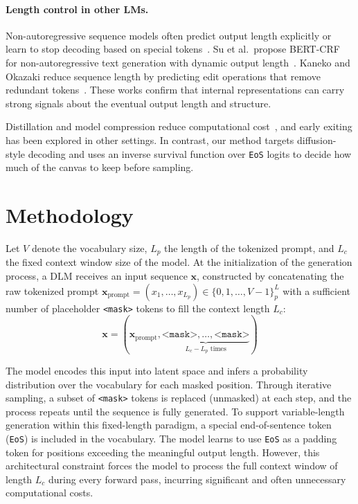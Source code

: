 \documentclass{article}
\theoremstyle{plain}
\theoremstyle{definition}
\theoremstyle{remark}
\begin{document}
\paragraph{Length control in other LMs.} Non-autoregressive sequence models often predict output length explicitly or learn to stop decoding based on special tokens~\citep{DBLP:journals/corr/abs-2004-10454}.
Su et al.\ propose BERT-CRF for non-autoregressive text generation with dynamic output length~\citep{Gu2021BERTCRF}.
Kaneko and Okazaki reduce sequence length by predicting edit operations that remove redundant tokens~\citep{kaneko2023reducingsequencelengthpredicting}.
These works confirm that internal representations can carry strong signals about the eventual output length and structure.

Distillation and model compression reduce computational cost~\citep{Sanh2019DistilBERT}, and early exiting has been explored in other settings.
In contrast, our method targets diffusion-style decoding and uses an inverse survival function over \texttt{EoS} logits to decide how much of the canvas to keep before sampling.

\section{Methodology}
\label{sec:methodology}

Let $V$ denote the vocabulary size, $L_p$ the length of the tokenized prompt, and $L_c$ the fixed context window size of the model. At the initialization of the generation process, a DLM receives an input sequence $\mathbf{x}$, constructed by concatenating the raw tokenized prompt $\mathbf{x}_{\text{prompt}}=(x_1, \dots,x_{L_p})\in\{0,1, \dots, V-1\}^L_p$ with a sufficient number of placeholder \texttt{<mask>} tokens to fill the context length $L_c$:
\begin{equation}
\mathbf{x}=(\mathbf{x}_{\text{prompt}}, \underbrace{\texttt{<mask>}, \dots, \texttt{<mask>}}_{L_c-L_p\text{ times}})
\end{equation}

The model encodes this input into latent space and infers a probability distribution over the vocabulary for each masked position. Through iterative sampling, a subset of \texttt{<mask>} tokens is replaced (unmasked) at each step, and the process repeats until the sequence is fully generated. To support variable-length generation within this fixed-length paradigm, a special end-of-sentence token (\texttt{EoS}) is included in the vocabulary. The model learns to use \texttt{EoS} as a padding token for positions exceeding the meaningful output length. However, this architectural constraint forces the model to process the full context window of length $L_c$ during every forward pass, incurring significant and often unnecessary computational costs.
\end{document}
